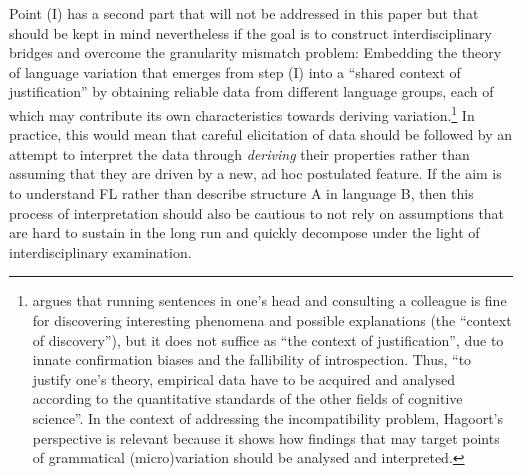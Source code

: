\documentclass[output=paper]{langsci/langscibook}
\begin{document}
Point (I) has a second part that will not be addressed in this paper but that
should be kept in mind nevertheless if the goal is to construct
interdisciplinary bridges and overcome the granularity mismatch problem:
Embedding the theory of language variation that emerges from step (I) into a
“shared context of justification” \citep{Hagoort2014} by obtaining reliable
data from different language groups, each of which may contribute its own
characteristics towards deriving variation.\footnote{\citet{Hagoort2014} argues
that running sentences in one’s head and consulting a colleague is fine for
discovering interesting phenomena and possible explanations (the \enquote{context of
discovery}), but it does not suffice as \enquote{the context of justification}, due to
innate confirmation biases and the fallibility of introspection. Thus, “to
justify one’s theory, empirical data have to be acquired and analysed according
to the quantitative standards of the other fields of cognitive science”. In the
context of addressing the incompatibility problem, Hagoort’s perspective is
relevant because it shows how findings that may target points of grammatical
(micro)variation should be analysed and interpreted.} In practice, this would
mean that careful elicitation of data should be followed by an attempt to
interpret the data through \emph{deriving} their properties rather than
assuming that they are driven by a new, ad hoc postulated feature. If
the aim is to understand \gls{FL} rather than describe structure A in language
B, then this process of interpretation should also be cautious to not rely on
assumptions that are hard to sustain in the long run and quickly decompose
under the light of interdisciplinary examination.
\end{document}
